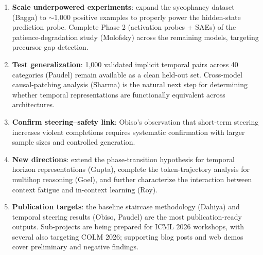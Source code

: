 \documentclass[final]{sparreport}
\begin{document}
\begin{enumerate}
  \item \textbf{Scale underpowered experiments}: expand the sycophancy dataset (Bagga) to $\sim$1,000 positive examples to properly power the hidden-state prediction probe. Complete Phase 2 (activation probes + SAEs) of the patience-degradation study (Molofsky) across the remaining models, targeting precursor gap detection.

  \item \textbf{Test generalization}: 1,000 validated implicit temporal pairs across 40 categories (Paudel) remain available as a clean held-out set. Cross-model causal-patching analysis (Sharma) is the natural next step for determining whether temporal representations are functionally equivalent across architectures.

  \item \textbf{Confirm steering--safety link}: Obiso's observation that short-term steering increases violent completions requires systematic confirmation with larger sample sizes and controlled generation.

  \item \textbf{New directions}: extend the phase-transition hypothesis for temporal horizon representations (Gupta), complete the token-trajectory analysis for multihop reasoning (Goel), and further characterize the interaction between context fatigue and in-context learning (Roy).

  \item \textbf{Publication targets}: the baseline staircase methodology (Dahiya) and temporal steering results (Obiso, Paudel) are the most publication-ready outputs. Sub-projects are being prepared for ICML 2026 workshops, with several also targeting COLM 2026; supporting blog posts and web demos cover preliminary and negative findings.
\end{enumerate}



\end{document}
